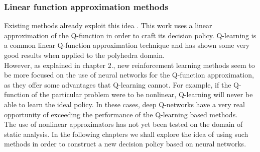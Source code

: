 \subsubsection{Linear function approximation methods}

Existing methods already exploit this idea \cite{singh2018fast}. This work uses a linear approximation of the Q-function in order to craft its decision policy. Q-learning is a common linear Q-function approximation technique and has shown some very good results when applied to the polyhedra domain.\\
However, as explained in chapter 2., new reinforcement learning methods seem to be more focused on the use of neural networks for the Q-function approximation, as they offer some advantages that Q-learning cannot. For example, if the Q-function of the particular problem were to be nonlinear, Q-learning will never be able to learn the ideal policy. In these cases, deep Q-networks have a very real opportunity of exceeding the performance of the Q-learning based methods.\\
The use of nonlinear approximators has not yet been tested on the domain of static analysis. In the following chapters we shall explore the idea of using such methods in order to construct a new decision policy based on neural networks.
















